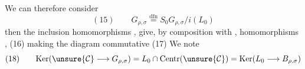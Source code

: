 We can therefore consider
\[
(15)\qquad G_{\rho,\sigma}\overset{\mathrm{dfn}}{=}S_0G_{\rho,\sigma}/i(L_0)
\]
then the inclusion homomorphisms
,
give, by composition with
,
homomorphisms
,
\hfill(16)
making the diagram commutative
\hfill(17)
We note
\[
(18)\qquad\mathrm{Ker}(\unsure{\mathcal{C}}\longrightarrow G_{\rho,\sigma})
=L_0\cap\mathrm{Centr}(\unsure{\mathcal{C}})
=\mathrm{Ker}(L_0\longrightarrow B_{\rho,\sigma})
\]

